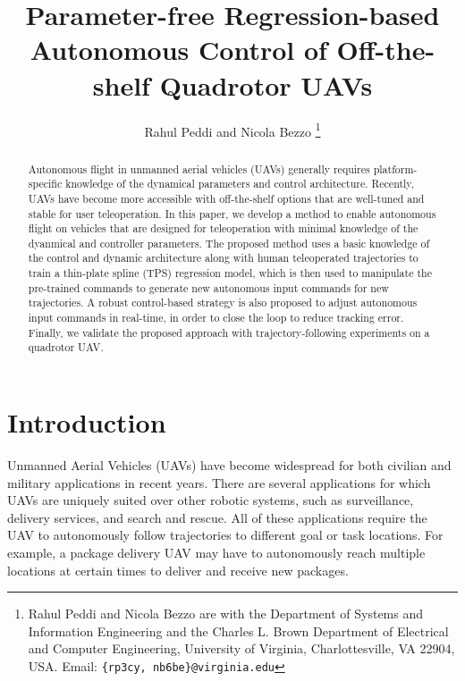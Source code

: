 \documentclass[letterpaper, 10 pt, conference]{ieeeconf}  %
\newcommand\NB[1]{$\spadesuit$\footnote{NB: #1}}
\begin{document}
\title{\LARGE \bf
Parameter-free Regression-based Autonomous Control of Off-the-shelf Quadrotor UAVs
}


\author{Rahul Peddi and Nicola Bezzo%
\thanks{Rahul Peddi and Nicola Bezzo are with the Department of Systems and Information Engineering and the Charles L. Brown Department of Electrical and Computer Engineering, University of Virginia, Charlottesville, VA 22904, USA. Email: {\tt \{rp3cy, nb6be\}@virginia.edu}}}



\maketitle
\thispagestyle{empty}
\pagestyle{empty}


\begin{abstract}
Autonomous flight in unmanned aerial vehicles (UAVs) generally requires platform-specific knowledge of the dynamical parameters and control architecture. Recently, UAVs have become more accessible with off-the-shelf options that are well-tuned and stable for user teleoperation. In this paper, we develop a method to enable autonomous flight on vehicles that are designed for teleoperation with minimal knowledge of the dyanmical and controller parameters. The proposed method uses a basic knowledge of the control and dynamic architecture along with human teleoperated trajectories to train a thin-plate spline (TPS) regression model, which is then used to manipulate the pre-trained commands to generate new autonomous input commands for new trajectories. A robust control-based strategy is also proposed to adjust autonomous input commands in real-time, in order to close the loop to reduce tracking error. Finally, we validate the proposed approach with trajectory-following experiments on a quadrotor UAV.

\end{abstract}


\section{Introduction}
Unmanned Aerial Vehicles (UAVs) have become widespread for both civilian and military applications in recent years. There are several applications for which UAVs are uniquely suited over other robotic systems, such as surveillance, delivery services, and search and rescue. All of these applications require the UAV to autonomously follow trajectories to different goal or task locations. For example, a package delivery UAV may have to autonomously reach multiple locations at certain times to deliver and receive new packages. 
\end{document}
